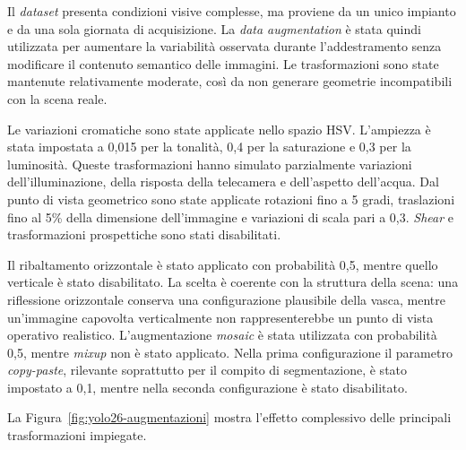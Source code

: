 Il \textit{dataset} presenta condizioni visive complesse, ma proviene da un unico impianto e da una sola giornata di acquisizione. La \textit{data augmentation} è stata quindi utilizzata per aumentare la variabilità osservata durante l'addestramento senza modificare il contenuto semantico delle immagini. Le trasformazioni sono state mantenute relativamente moderate, così da non generare geometrie incompatibili con la scena reale.

Le variazioni cromatiche sono state applicate nello spazio HSV. L'ampiezza è stata impostata a 0{,}015 per la tonalità, 0{,}4 per la saturazione e 0{,}3 per la luminosità. Queste trasformazioni hanno simulato parzialmente variazioni dell'illuminazione, della risposta della telecamera e dell'aspetto dell'acqua. Dal punto di vista geometrico sono state applicate rotazioni fino a 5 gradi, traslazioni fino al 5\% della dimensione dell'immagine e variazioni di scala pari a 0{,}3. \textit{Shear} e trasformazioni prospettiche sono stati disabilitati.

Il ribaltamento orizzontale è stato applicato con probabilità 0{,}5, mentre quello verticale è stato disabilitato. La scelta è coerente con la struttura della scena: una riflessione orizzontale conserva una configurazione plausibile della vasca, mentre un'immagine capovolta verticalmente non rappresenterebbe un punto di vista operativo realistico. L'augmentazione \textit{mosaic} è stata utilizzata con probabilità 0{,}5, mentre \textit{mixup} non è stato applicato. Nella prima configurazione il parametro \textit{copy-paste}, rilevante soprattutto per il compito di segmentazione, è stato impostato a 0{,}1, mentre nella seconda configurazione è stato disabilitato.

La Figura~\ref{fig:yolo26-augmentazioni} mostra l'effetto complessivo delle principali trasformazioni impiegate.

